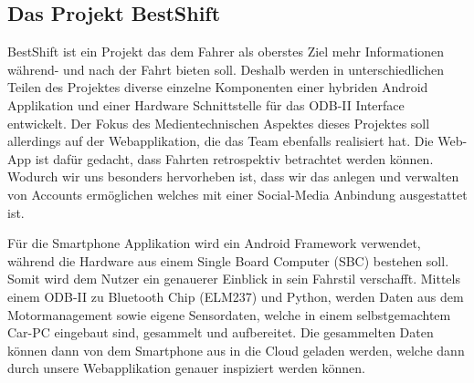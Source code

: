 \subsection{Das Projekt BestShift}

BestShift ist ein Projekt das dem Fahrer als oberstes Ziel mehr Informationen während- und nach der Fahrt bieten soll. 
Deshalb werden in unterschiedlichen Teilen des Projektes 
diverse einzelne Komponenten einer hybriden Android Applikation und einer Hardware Schnittstelle für das ODB-II 
Interface entwickelt. Der Fokus des Medientechnischen Aspektes dieses Projektes soll allerdings auf der Webapplikation, die das Team ebenfalls realisiert hat. 
Die Web-App ist dafür gedacht, dass Fahrten retrospektiv betrachtet werden können.
Wodurch wir uns besonders hervorheben ist, dass wir das anlegen und verwalten von Accounts ermöglichen welches mit einer Social-Media Anbindung ausgestattet ist.
 

Für die Smartphone Applikation wird ein Android Framework verwendet, 
während die Hardware aus einem Single Board Computer (SBC) bestehen soll. Somit wird dem Nutzer ein genauerer Einblick in sein Fahrstil verschafft. 
Mittels einem ODB-II zu Bluetooth Chip (ELM237) und Python, 
werden Daten aus dem Motormanagement sowie eigene Sensordaten, welche in einem selbstgemachtem Car-PC eingebaut sind,
gesammelt und aufbereitet. 
Die gesammelten Daten können dann von dem Smartphone aus in die Cloud geladen werden, welche dann durch unsere
Webapplikation genauer inspiziert werden können.
\clearpage %